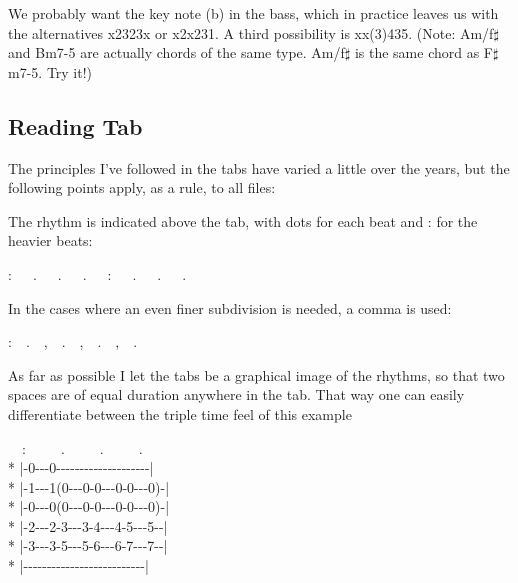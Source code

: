 We probably want the key note (b) in the bass, which in practice
leaves us with the alternatives x2323x or x2x231. A third possibility is xx(3)435. (Note:
Am/f$\sharp$ and Bm7-5 are actually chords of the same
type. Am/f$\sharp$ is the same chord as F$\sharp$m7-5. Try it!)


\subsection*{Reading Tab}

The principles I've followed in the tabs have varied a little over the
years, but the following points apply, as a rule, to all files:

The rhythm is indicated above the tab, with dots for each beat and :
for the heavier beats:

\begin{pre}:~~~.~~~.~~~.~~~:~~~.~~~.~~~.\end{pre}

In the cases where an even finer subdivision is needed, a comma is
used:

\begin{pre}:~~.~~,~~.~~,~~.~~,~~.\end{pre}

As far as possible I let the tabs be a graphical image of the rhythms,
so that two spaces are of equal duration anywhere in the tab. That way
one can easily differentiate between the triple time feel of this
example

\begin{pre}
\begin{adjustwidth}{2em}{0em}
~~:~~~~~.~~~~~.~~~~~.\\*
|{-}0{-}{-}{-}0{-}{-}{-}{-}{-}{-}{-}{-}{-}{-}{-}{-}{-}{-}{-}{-}{-}{-}{-}{-}|\\*
|{-}1{-}{-}{-}1(0{-}{-}{-}0{-}0{-}{-}{-}0{-}0{-}{-}{-}0){-}|\\*
|{-}0{-}{-}{-}0(0{-}{-}{-}0{-}0{-}{-}{-}0{-}0{-}{-}{-}0){-}|\\*
|{-}2{-}{-}{-}2{-}3{-}{-}{-}3{-}4{-}{-}{-}4{-}5{-}{-}{-}5{-}{-}|\\*
|{-}3{-}{-}{-}3{-}5{-}{-}{-}5{-}6{-}{-}{-}6{-}7{-}{-}{-}7{-}{-}|\\*
|{-}{-}{-}{-}{-}{-}{-}{-}{-}{-}{-}{-}{-}{-}{-}{-}{-}{-}{-}{-}{-}{-}{-}{-}{-}{-}|
\end{adjustwidth}
\end{pre}

